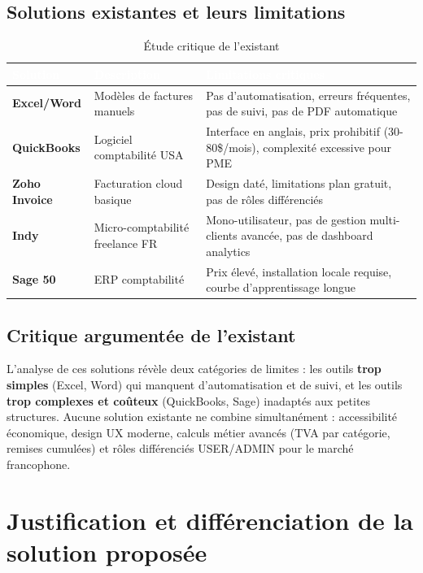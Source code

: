 \documentclass[12pt,a4paper]{report}
\begin{document}
\subsection{Solutions existantes et leurs limitations}

\begin{table}[H]
\centering
\caption{Étude critique de l'existant}
\label{tab:existant}
\begin{tabularx}{\textwidth}{|l|X|X|}
\hline
\rowcolor{emsiblue}\textcolor{white}{\textbf{Solution}} & \textcolor{white}{\textbf{Description}} & \textcolor{white}{\textbf{Limitations critiques}} \\
\hline
\textbf{Excel/Word} & Modèles de factures manuels & Pas d'automatisation, erreurs fréquentes, pas de suivi, pas de PDF automatique \\
\textbf{QuickBooks} & Logiciel comptabilité USA & Interface en anglais, prix prohibitif (30-80\$/mois), complexité excessive pour PME \\
\textbf{Zoho Invoice} & Facturation cloud basique & Design daté, limitations plan gratuit, pas de rôles différenciés \\
\textbf{Indy} & Micro-comptabilité freelance FR & Mono-utilisateur, pas de gestion multi-clients avancée, pas de dashboard analytics \\
\textbf{Sage 50} & ERP comptabilité & Prix élevé, installation locale requise, courbe d'apprentissage longue \\
\hline
\end{tabularx}
\end{table}

\subsection{Critique argumentée de l'existant}

L'analyse de ces solutions révèle deux catégories de limites : les outils \textbf{trop simples} (Excel, Word) qui manquent d'automatisation et de suivi, et les outils \textbf{trop complexes et coûteux} (QuickBooks, Sage) inadaptés aux petites structures. Aucune solution existante ne combine simultanément : accessibilité économique, design UX moderne, calculs métier avancés (TVA par catégorie, remises cumulées) et rôles différenciés USER/ADMIN pour le marché francophone.

\section{Justification et différenciation de la solution proposée}
\end{document}

